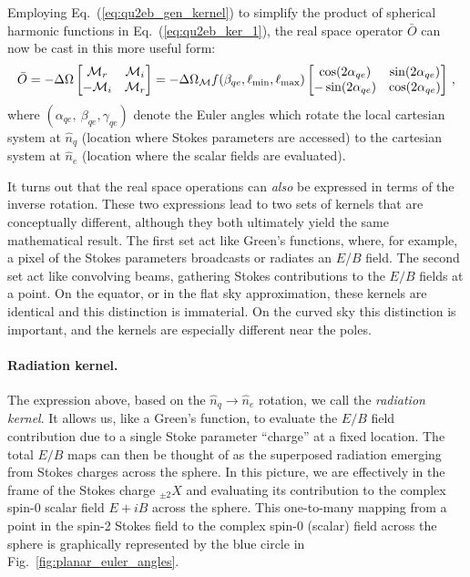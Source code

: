 \documentclass[a4paper,11pt]{article}
\newcommand{\beq}{\begin{equation}}
\newcommand{\eeq}{\end{equation}}
\newcommand{\bmat}{\begin{bmatrix}}
\newcommand{\emat}{\end{bmatrix}}
\newcommand{\mm}{\mathcal{M}}
\def\eq#1{{Eq.~(\ref{#1})}}
\def\fig#1{{Fig.~\ref{#1}}}
\begin{document}
Employing \eq{eq:qu2eb_gen_kernel} to simplify the product of spherical harmonic functions in \eq{eq:qu2eb_ker_1}, the real space operator $\bar{O}$ can now be cast in this more useful form:
%
\beq\label{eq:op_qu2eb_rad}
\bar O =- \Delta \Omega \bmat  \mathcal{M}_{r} & \mathcal{M}_{i} \\  -\mathcal{M}_{i}  & \mathcal{M}_{r} \emat = - \Delta \Omega {{}_{\mm}f}(\beta_{qe},\ell_{\rm min},\ell_{\rm max})\bmat \cos(2 \alpha_{qe}) & \sin(2\alpha_{qe})\\  -\sin(2 \alpha_{qe})  & \cos(2 \alpha_{qe}) \emat \,,
\eeq
%
where $(\alpha_{qe}, ~\beta_{qe}, \gamma_{qe})$ denote the Euler angles which rotate the local cartesian system at $\hat{n}_q$ (location where Stokes parameters are accessed) to the cartesian system at  $\hat{n}_e$ (location where the scalar fields are evaluated).

It turns out that the real space operations can \emph{also} be expressed in terms of the inverse rotation.  These two expressions lead to two sets of kernels that are conceptually different, although they both ultimately yield the same mathematical result. The first set act like Green's functions, where, for example, a pixel of the Stokes parameters broadcasts or radiates an $E$/$B$ field.  The second set act like convolving beams, gathering Stokes contributions to the $E/B$ fields at a point. On the equator, or in the flat sky approximation, these kernels are identical and this distinction is immaterial.  On the curved sky this distinction is important, and the kernels are especially different near the poles.


\paragraph{Radiation kernel.} The expression above, based on the $\hat n_q \rightarrow \hat n_e$ rotation,  we call the \textit{radiation kernel}.  It allows us, like a Green's function, to evaluate the $E/B$ field contribution due to a single Stoke parameter ``charge'' at a fixed location. The total $E/B$ maps can then be thought of as the superposed radiation emerging from Stokes charges across the sphere. In this picture, we are effectively in the frame of the Stokes charge ${}_{\pm2}X$ and evaluating its contribution to the complex spin-0 scalar field $E+iB$ across the sphere. This one-to-many mapping from a point in the spin-2 Stokes field to the complex spin-0 (scalar) field across the sphere is graphically represented by the blue circle in \fig{fig:planar_euler_angles}.
\end{document}
